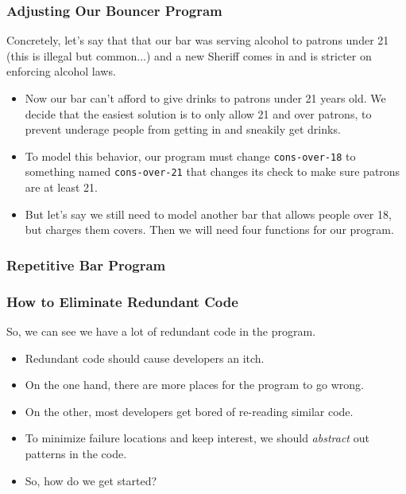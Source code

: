\documentclass{beamer}
\begin{document}
\begin{frame}
  \frametitle{Adjusting Our Bouncer Program}
  Concretely, let's say that that our bar was serving alcohol to
    patrons under 21 (this is illegal but common...) and a new Sheriff comes in
    and is stricter on enforcing alcohol laws.
    \begin{itemize}
  \item<2-> Now our bar can't afford to give drinks to patrons under 21 years old.
    We decide that the easiest solution is to only allow 21 and over patrons,
    to prevent underage people from getting in and sneakily get drinks.
  \item<3-> To model this behavior, our program must change
    \texttt{cons-over-18} to something named \texttt{cons-over-21} that changes its check to make sure patrons are at least 21.
  \item<4-> But let's say we still need to model another bar that allows people over 18, but charges them covers. Then we will need four functions for our program.  
  \end{itemize}
\end{frame}

\begin{frame}
  \frametitle{Repetitive Bar Program}
  \BarComplex
\end{frame}

\begin{frame}
  \frametitle{How to Eliminate Redundant Code}
  So, we can see we have a lot of redundant code in the program.
  \begin{itemize}
  \item<2-> Redundant code should cause developers an itch.
  \item<3-> On the one hand, there are more places for the program
    to go wrong.
  \item<4-> On the other, most developers get bored of re-reading similar code.
  \item<5-> To minimize failure locations and keep interest, we should
    \emph{abstract} out patterns in the code.
  \item<6-> So, how do we get started?
  \end{itemize}
\end{frame}
\end{document}

